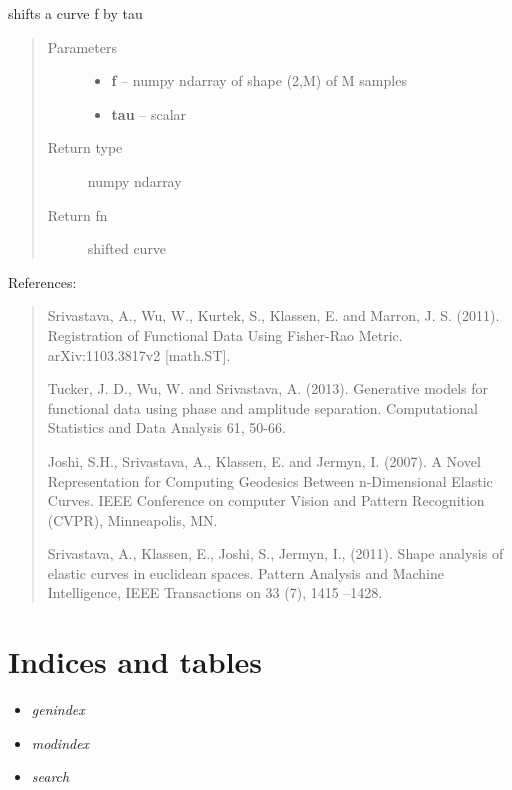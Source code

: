 \documentclass[letterpaper,10pt,english]{sphinxmanual}
\begin{document}

\begin{fulllineitems}
\label{curve_functions:curve_functions.shift_f}
shifts a curve f by tau
\begin{quote}\begin{description}
\item[{Parameters}] \leavevmode\begin{itemize}
\item {} 
\textbf{f} -- numpy ndarray of shape (2,M) of M samples

\item {} 
\textbf{tau} -- scalar

\end{itemize}

\item[{Return type}] \leavevmode
numpy ndarray

\item[{Return fn}] \leavevmode
shifted curve

\end{description}\end{quote}

\end{fulllineitems}


References:
\begin{quote}

Srivastava, A., Wu, W., Kurtek, S., Klassen, E. and Marron, J. S. (2011).
Registration of Functional Data Using Fisher-Rao Metric.
arXiv:1103.3817v2 {[}math.ST{]}.

Tucker, J. D., Wu, W. and Srivastava, A. (2013). Generative models for
functional data using phase and amplitude separation. Computational
Statistics and Data Analysis 61, 50-66.

Joshi, S.H., Srivastava, A., Klassen, E. and Jermyn, I. (2007).
A Novel Representation for Computing Geodesics Between n-Dimensional
Elastic Curves. IEEE Conference on computer Vision and Pattern Recognition
(CVPR), Minneapolis, MN.

Srivastava, A., Klassen, E., Joshi, S., Jermyn, I., (2011). Shape analysis
of elastic curves in euclidean spaces. Pattern Analysis and Machine
Intelligence, IEEE Transactions on 33 (7), 1415 –1428.
\end{quote}


\chapter{Indices and tables}
\label{index:indices-and-tables}\begin{itemize}
\item {} 
\emph{genindex}

\item {} 
\emph{modindex}

\item {} 
\emph{search}

\end{itemize}
\end{document}
